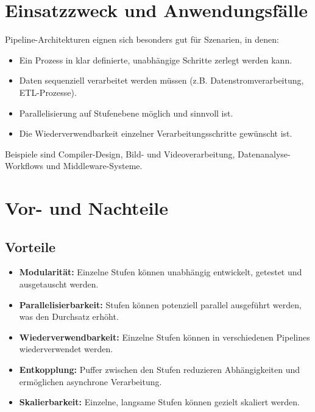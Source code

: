 \documentclass[a4paper]{article} %
\begin{document}
\section{Einsatzzweck und Anwendungsfälle}
Pipeline-Architekturen eignen sich besonders gut für Szenarien, in denen:
\begin{itemize}
    \item Ein Prozess in klar definierte, unabhängige Schritte zerlegt werden kann.
    \item Daten sequenziell verarbeitet werden müssen (z.B. Datenstromverarbeitung, ETL-Prozesse).
    \item Parallelisierung auf Stufenebene möglich und sinnvoll ist.
    \item Die Wiederverwendbarkeit einzelner Verarbeitungsschritte gewünscht ist.
\end{itemize}
Beispiele sind Compiler-Design, Bild- und Videoverarbeitung, Datenanalyse-Workflows und Middleware-Systeme.
\lipsum[4-5]



\section{Vor- und Nachteile}
\subsection{Vorteile}
\begin{itemize}
    \item \textbf{Modularität:} Einzelne Stufen können unabhängig entwickelt, getestet und ausgetauscht werden.
    \item \textbf{Parallelisierbarkeit:} Stufen können potenziell parallel ausgeführt werden, was den Durchsatz erhöht.
    \item \textbf{Wiederverwendbarkeit:} Einzelne Stufen können in verschiedenen Pipelines wiederverwendet werden.
    \item \textbf{Entkopplung:} Puffer zwischen den Stufen reduzieren Abhängigkeiten und ermöglichen asynchrone Verarbeitung.
    \item \textbf{Skalierbarkeit:} Einzelne, langsame Stufen können gezielt skaliert werden.
\end{itemize}
\blindtext[2]
\end{document}
